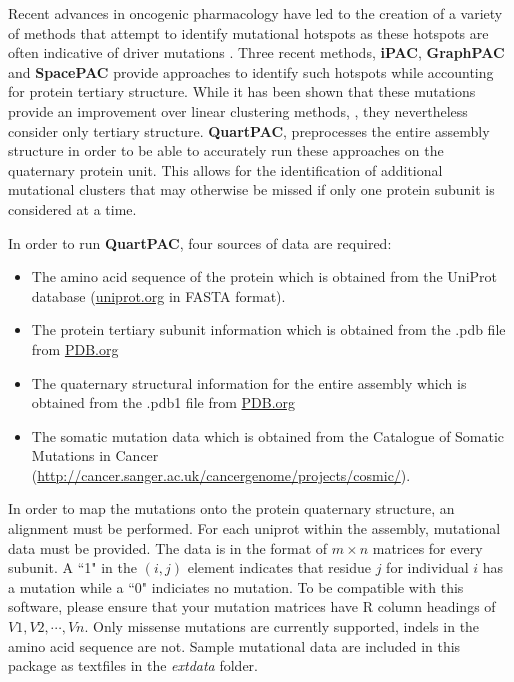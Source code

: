 \documentclass{article}
\def \GraphPAC{\textbf{GraphPAC}}
\def \iPAC{\textbf{iPAC}}
\def \SpacePAC{\textbf{SpacePAC}}
\def \QuartPAC{\textbf{QuartPAC}}
\begin{document}
Recent advances in oncogenic pharmacology \citep{croce_oncogenes_2008} have led to the creation of a variety of methods that attempt to identify mutational hotspots as these hotspots are often indicative of driver mutations \citep{wagner_rapid_2007, zhou_detecting_2008,ye_2010}. Three recent methods, \iPAC{}, \GraphPAC{} and \SpacePAC{} provide approaches to identify such hotspots while accounting for protein tertiary structure. While it has been shown that these mutations provide an improvement over linear clustering methods, \citep{ipac_paper_2013,graphpac_paper_2013,spacepac_paper_2014}, they nevertheless consider only tertiary structure. \QuartPAC, preprocesses the entire assembly structure in order to be able to accurately run these approaches on the quaternary protein unit. This allows for the identification of additional mutational clusters that may otherwise be missed if only one protein subunit is considered at a time.

In order to run \QuartPAC, four sources of data are required:
\begin{itemize}
\item The amino acid sequence of the protein which is obtained from the UniProt database (\url{uniprot.org} in FASTA format). 
\item The protein tertiary subunit information which is obtained from the .pdb file from \url{PDB.org}
\item The quaternary structural information for the entire assembly which is obtained from the .pdb1 file from \url{PDB.org}
\item The somatic mutation data which is obtained from the Catalogue of Somatic Mutations in Cancer (\url{http://cancer.sanger.ac.uk/cancergenome/projects/cosmic/}).
\end{itemize}

In order to map the mutations onto the protein quaternary structure, an alignment must be performed. For each uniprot within the assembly, mutational data must be provided. The data is in the format of $m \times n$ matrices for every subunit. A ``1" in the $(i,j)$ element indicates that residue $j$ for individual $i$ has a mutation while a ``0" indiciates no mutation. To be compatible with this software, please ensure that your mutation matrices have R column headings of $V1, V2,\cdots, Vn$. Only missense mutations are currently supported, indels in the amino acid sequence are not. Sample mutational data are included in this package as textfiles in the \emph{extdata} folder. 
\end{document}
